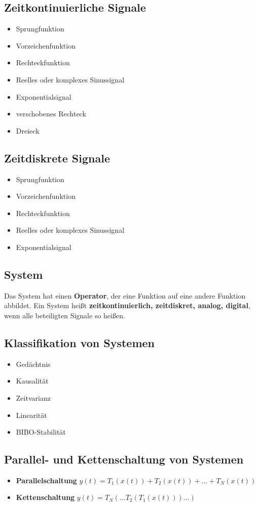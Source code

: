 \documentclass[10pt,a4paper]{article}
\begin{document}
\subsection*{Zeitkontinuierliche Signale}
\begin{itemize}
	\item Sprungfunktion
	\item Vorzeichenfunktion
	\item Rechteckfunktion
	\item Reelles oder komplexes Sinussignal
	\item Exponentialsignal
	\item verschobenes Rechteck
	\item Dreieck
\end{itemize}
\subsection*{Zeitdiskrete Signale}
\begin{itemize}
	\item Sprungfunktion
	\item Vorzeichenfunktion
	\item Rechteckfunktion
	\item Reelles oder komplexes Sinussignal
	\item Exponentialsignal
\end{itemize}
\subsection*{System}
	Das System hat einen \textbf{Operator}, der eine Funktion auf eine andere Funktion abbildet. Ein System heißt \textbf{zeitkontinuierlich, zeitdiskret, analog, digital}, wenn alle beteiligten Signale so heißen.
\subsection*{Klassifikation von Systemen}
\begin{itemize}
	\item Gedächtnis
	\item Kausalität
	\item Zeitvarianz
	\item Linearität
	\item BIBO-Stabilität
\end{itemize}
\subsection*{Parallel- und Kettenschaltung von Systemen}
\begin{itemize}
	\item \textbf{Parallelschaltung} $y(t)=T_1(x(t))+T_2(x(t))+...+T_N(x(t))$
	\item \textbf{Kettenschaltung} 	$y(t)=T_N(...T_2(T_1(x(t)))...)$
\end{itemize}
\end{document}
